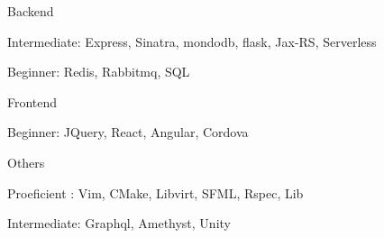 \begin{cvskills}
  \cvskill
    {Backend} %
    {
      \begin{cvitems} %
        \item Intermediate:                 Express, Sinatra, mondodb, flask, Jax-RS, Serverless
        \item Beginner:\hspace{5mm}         Redis, Rabbitmq, SQL
      \end{cvitems}
    }
  \cvskill
    {Frontend} %
    {
      \begin{cvitems} %
      \item Beginner:\hspace{5mm}                     JQuery, React, Angular, Cordova
      \end{cvitems}
    }
  \cvskill
    {Others} %
    {
      \begin{cvitems} %
      \item Proeficient :\hspace{2.5mm}   Vim, CMake, Libvirt, SFML, Rspec, Lib
      \item Intermediate:\hspace{0.5mm} Graphql, Amethyst, Unity
      \end{cvitems}
    }


\end{cvskills}
